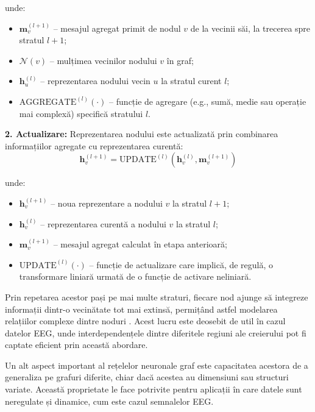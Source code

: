 \documentclass[12pt,a4paper]{report}
\theoremstyle{definition}
\theoremstyle{remark}
\begin{document}
\noindent unde:
\begin{itemize}
    \item $\mathbf{m}_v^{(l+1)}$ -- mesajul agregat primit de nodul $v$ de la vecinii săi, la trecerea spre stratul $l+1$;
    \item $\mathcal{N}(v)$ -- mulțimea vecinilor nodului $v$ în graf;
    \item $\mathbf{h}_u^{(l)}$ -- reprezentarea nodului vecin $u$ la stratul curent $l$;
    \item $\text{AGGREGATE}^{(l)}(\cdot)$ -- funcție de agregare (e.g., sumă, medie sau operație mai complexă) specifică stratului $l$.
\end{itemize}

\textbf{2. Actualizare:} Reprezentarea nodului este actualizată prin combinarea informațiilor agregate cu reprezentarea curentă:
\begin{equation}
    \mathbf{h}_v^{(l+1)} = \text{UPDATE}^{(l)}\left(\mathbf{h}_v^{(l)}, \mathbf{m}_v^{(l+1)}\right)
    \label{eq:update}
\end{equation}

\noindent unde:
\begin{itemize}
    \item $\mathbf{h}_v^{(l+1)}$ -- noua reprezentare a nodului $v$ la stratul $l+1$;
    \item $\mathbf{h}_v^{(l)}$ -- reprezentarea curentă a nodului $v$ la stratul $l$;
    \item $\mathbf{m}_v^{(l+1)}$ -- mesajul agregat calculat în etapa anterioară;
    \item $\text{UPDATE}^{(l)}(\cdot)$ -- funcție de actualizare care implică, de regulă, o transformare liniară urmată de o funcție de activare neliniară.
\end{itemize}

Prin repetarea acestor pași pe mai multe straturi, fiecare nod ajunge să integreze informații dintr-o vecinătate tot mai extinsă, permițând astfel modelarea relațiilor complexe dintre noduri \cite{klepl2023gnn}. Acest lucru este deosebit de util în cazul datelor EEG, unde interdependențele dintre diferitele regiuni ale creierului pot fi captate eficient prin această abordare.

Un alt aspect important al rețelelor neuronale graf este capacitatea acestora de a generaliza pe grafuri diferite, chiar dacă acestea au dimensiuni sau structuri variate. Această proprietate le face potrivite pentru aplicații în care datele sunt neregulate și dinamice, cum este cazul semnalelor EEG.
\end{document}
